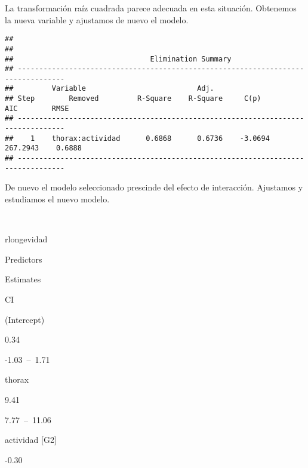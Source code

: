 \documentclass[
]{book}
\newenvironment{Shaded}{\begin{snugshade}}{\end{snugshade}}
\newcommand{\CommentTok}[1]{\textcolor[rgb]{0.56,0.35,0.01}{\textit{#1}}}
\newcommand{\DataTypeTok}[1]{\textcolor[rgb]{0.13,0.29,0.53}{#1}}
\newcommand{\FloatTok}[1]{\textcolor[rgb]{0.00,0.00,0.81}{#1}}
\newcommand{\KeywordTok}[1]{\textcolor[rgb]{0.13,0.29,0.53}{\textbf{#1}}}
\newcommand{\NormalTok}[1]{#1}
\newcommand{\OperatorTok}[1]{\textcolor[rgb]{0.81,0.36,0.00}{\textbf{#1}}}
\newcommand{\StringTok}[1]{\textcolor[rgb]{0.31,0.60,0.02}{#1}}
\theoremstyle{definition}
\theoremstyle{definition}
\theoremstyle{definition}
\theoremstyle{remark}
\begin{document}
La transformación raíz cuadrada parece adecuada en esta situación. Obtenemos la nueva variable y ajustamos de nuevo el modelo.

\begin{Shaded}
\end{Shaded}

\begin{verbatim}
## 
## 
##                                Elimination Summary                                
## ---------------------------------------------------------------------------------
##         Variable                          Adj.                                       
## Step        Removed         R-Square    R-Square     C(p)        AIC        RMSE     
## ---------------------------------------------------------------------------------
##    1    thorax:actividad      0.6868      0.6736    -3.0694    267.2943    0.6888    
## ---------------------------------------------------------------------------------
\end{verbatim}

De nuevo el modelo seleccionado prescinde del efecto de interacción. Ajustamos y estudiamos el nuevo modelo.

~

rlongevidad

Predictors

Estimates

CI

(Intercept)

0.34

-1.03~--~1.71

thorax

9.41

7.77~--~11.06

actividad {[}G2{]}

-0.30
\end{document}
